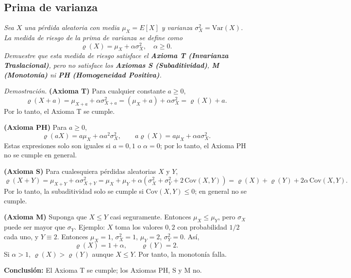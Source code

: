 \vspace{0.5cm}

\noindent \subsection{Prima de varianza} \textit{Sea $X$ una pérdida aleatoria con media $\mu_X = E[X]$ y varianza $\sigma_X^2 = \text{Var}(X)$. La medida de riesgo de la prima de varianza se define como}
\[
\varrho(X) = \mu_X + \alpha\sigma_X^2, \quad \alpha \geq 0.
\]
\textit{Demuestre que esta medida de riesgo satisface el \textbf{Axioma T (Invarianza Traslacional)}, pero no satisface los \textbf{Axiomas S (Subaditividad)}, \textbf{M (Monotonía)} ni \textbf{PH (Homogeneidad Positiva)}.}

\vspace{0.3cm}
\noindent \textit{Demostración.} \textbf{(Axioma T)} Para cualquier constante $a \geq 0$,
\[
\varrho(X + a) = \mu_{X+a} + \alpha\sigma_{X+a}^2 = (\mu_X + a) + \alpha\sigma_X^2 = \varrho(X) + a.
\]
Por lo tanto, el Axioma T se cumple.

\vspace{0.2cm}
\noindent \textbf{(Axioma PH)} Para $a \geq 0$,
\[
\varrho(aX) = a\mu_X + \alpha a^2\sigma_X^2, \qquad a\varrho(X) = a\mu_X + \alpha a\sigma_X^2.
\]
Estas expresiones solo son iguales si $a = 0, 1$ o $\alpha = 0$; por lo tanto, el Axioma PH no se cumple en general.

\vspace{0.2cm}
\noindent \textbf{(Axioma S)} Para cualesquiera pérdidas aleatorias $X$ y $Y$,
\[
\varrho(X + Y) = \mu_{X+Y} + \alpha\sigma_{X+Y}^2 = \mu_X + \mu_Y + \alpha(\sigma_X^2 + \sigma_Y^2 + 2\,\text{Cov}(X,Y)) = \varrho(X) + \varrho(Y) + 2\alpha\,\text{Cov}(X,Y).
\]
Por lo tanto, la subaditividad solo se cumple si $\text{Cov}(X,Y) \leq 0$; en general no se cumple.

\vspace{0.2cm}
\noindent \textbf{(Axioma M)} Suponga que $X \leq Y$ casi seguramente. Entonces $\mu_X \leq \mu_Y$, pero $\sigma_X$ puede ser mayor que $\sigma_Y$. Ejemplo: $X$ toma los valores $0, 2$ con probabilidad $1/2$ cada uno, y $Y \equiv 2$. Entonces $\mu_X = 1$, $\sigma_X^2 = 1$, $\mu_Y = 2$, $\sigma_Y^2 = 0$. Así,
\[
\varrho(X) = 1 + \alpha, \qquad \varrho(Y) = 2.
\]
Si $\alpha > 1$, $\varrho(X) > \varrho(Y)$ aunque $X \leq Y$. Por tanto, la monotonía falla.

\vspace{0.2cm}
\textbf{Conclusión:} El Axioma T se cumple; los Axiomas PH, S y M no. 

